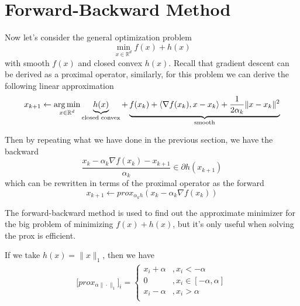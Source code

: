 \section{Forward-Backward Method}
Now let's consider the general optimization problem
\begin{equation*}
    \min_{x \in \mathbb{R}^d} f(x) + h(x)
\end{equation*}
with smooth $f(x)$ and closed convex $h(x)$. Recall that gradient descent can be derived as a proximal operator, similarly, for this problem we can derive the following linear approximation
\begin{equation*}
    x_{k+1} \leftarrow \operatorname*{arg\,min}_{x \in \mathbb{R}^d} \underbrace{h(x)}_{\text{closed convex}} + \underbrace{f(x_k) + \langle \nabla f(x_k), x-x_k \rangle + \frac{1}{2\alpha_k} \| x - x_k \|^2}_{\text{smooth}}
\end{equation*}

Then by repeating what we have done in the previous section, we have the backward
\begin{equation*}
    \frac{x_k - \alpha_k\nabla f(x_k) - x_{k+1}}{\alpha_k} \in \partial h(x_{k+1})
\end{equation*}
which can be rewritten in terms of the proximal operator as the forward
\begin{equation*}
    x_{k+1} \leftarrow prox_{\alpha_kh}(x_k - \alpha_k \nabla f(x_k))
\end{equation*}
\begin{remark}
    The forward-backward method is used to find out the approximate minimizer for the big problem of minimizing $f(x) + h(x)$, but it's only useful when solving the prox is efficient.
\end{remark}

\begin{example}
    If we take $h(x) = \| x \|_1$, then we have
    \begin{align*}
        \big[ prox_{\alpha \| \cdot \|_1} \big]_i = 
        \left\{
        \begin{array}{ll}
            x_i + \alpha&, x_i < -\alpha \\
            0&, x_i \in [-\alpha, \alpha] \\
            x_i - \alpha&, x_i > \alpha \\
        \end{array}
        \right.
    \end{align*}
\end{example}

